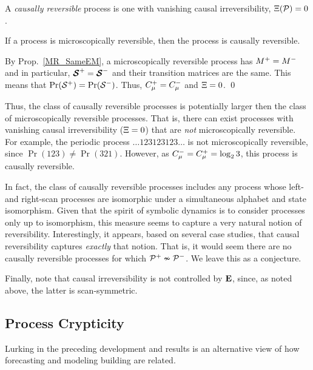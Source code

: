 \begin{Def}
A \emph{causally reversible} process is one with vanishing causal 
irreversibility, $\Xi(\mathcal{P}) = 0$.
\end{Def}

\begin{Prop}
If a process is microscopically reversible, then the process is causally reversible.
\label{CI_MicroIrreversible}
\end{Prop}

\begin{ProProp}
By Prop.~\ref{MR_SameEM}, a microscopically reversible process has 
${M}^{+} = {M}^{-}$ and in particular, 
${\boldsymbol{\mathcal{S}}}^{+} = {\boldsymbol{\mathcal{S}}}^{-}$ and their transition
matrices are the same. This means that 
$\Pr({\mathcal{S}}^{+}) = \Pr({\mathcal{S}}^{-})$.  Thus, $C_\mu^{+} = C_\mu^{-}$
and $\Xi = 0$.
\qed\end{ProProp}

Thus, the class of causally reversible processes is potentially larger
then the class of microscopically reversible processes.  That is, there
can exist processes with vanishing causal irreversibility ($\Xi = 0$) that
are \textit{not} microscopically reversible. For example, the periodic 
process $\ldots 123123123 \ldots$ is not
microscopically reversible, since $\Pr(123) \neq \Pr(321)$.
However, as $C_\mu^{-} = C_\mu^{+} = \log_2 3$, this process is 
causally reversible.

In fact, the class of causally reversible
processes includes any process 
whose  left- and right-scan processes are isomorphic under a simultaneous 
alphabet and state isomorphism. Given that the 
spirit of symbolic dynamics is to consider processes only up to 
isomorphism, this measure seems to capture a very natural notion of
reversibility. Interestingly, it appears, based on several case studies, 
that causal reversibility captures \emph{exactly} that notion. That is, it would 
seem there are no causally reversible processes for which ${\mathcal{P}}^{+} \nsim 
{\mathcal{P}}^{-}$. We leave this as a conjecture.

Finally, note that causal irreversibility is not controlled by ${\bf E}$, since,
as noted above, the latter is scan-symmetric.

\subsection{Process Crypticity}

Lurking in the preceding development and results is an alternative
view of how forecasting and modeling building are related.

